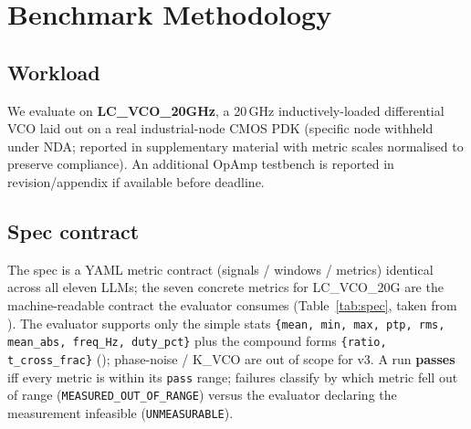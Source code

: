 
\section{Benchmark Methodology}
\label{sec:methodology}

\subsection{Workload}
\label{sec:method-workload}

We evaluate on \textbf{LC\_VCO\_20GHz}, a 20\,GHz inductively-loaded
differential VCO laid out on a real industrial-node CMOS PDK
(specific node withheld under NDA; reported in supplementary
material with metric scales normalised to preserve compliance).
An additional OpAmp testbench is reported in revision/appendix if
available before deadline.

\subsection{Spec contract}
\label{sec:method-spec}

The spec is a YAML metric contract (signals / windows / metrics)
identical across all eleven LLMs; the seven concrete metrics for
LC\_VCO\_20G are the machine-readable contract the evaluator
consumes (Table~\ref{tab:spec}, taken from
). The evaluator supports only the simple
stats \texttt{\{mean, min, max, ptp, rms, mean\_abs, freq\_Hz,
duty\_pct\}} plus the compound forms
\texttt{\{ratio, t\_cross\_frac\}}
(); phase-noise / K\_VCO
are out of scope for v3. A run \textbf{passes} iff every metric is
within its \texttt{pass} range; failures classify by which metric
fell out of range (\texttt{MEASURED\_OUT\_OF\_RANGE}) versus the
evaluator declaring the measurement infeasible
(\texttt{UNMEASURABLE}).

